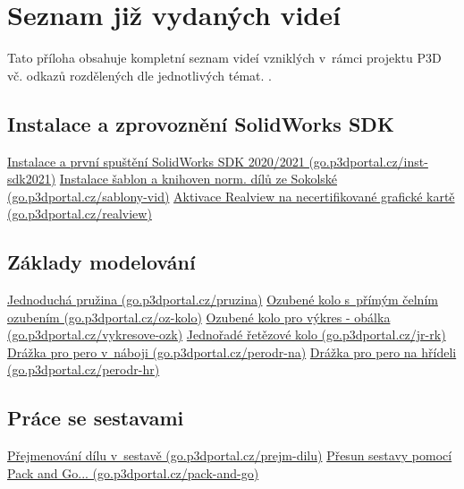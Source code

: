\chapter{Seznam již vydaných videí} \label{released-videos}
Tato příloha obsahuje kompletní seznam videí vzniklých v~rámci projektu P3D vč. odkazů rozdělených dle jednotlivých témat. \newline
\noindent{}.

\section{Instalace a zprovoznění SolidWorks SDK} \label{videa-instalace}
\href{https://go.p3dportal.cz/inst-sdk2021}{Instalace a první spuštění SolidWorks SDK 2020/2021 (go.p3dportal.cz/inst-sdk2021)} \newline
\href{https://go.p3dportal.cz/sablony-vid}{Instalace šablon a knihoven norm. dílů ze Sokolské (go.p3dportal.cz/sablony-vid)} \newline
\href{https://go.p3dportal.cz/GkkCtx}{Aktivace Realview na necertifikované grafické kartě (go.p3dportal.cz/realview)} \newline

\section{Základy modelování} \label{videa-modelovani}
\href{https://go.p3dportal.cz/pruzina}{Jednoduchá pružina (go.p3dportal.cz/pruzina)} \newline
\href{https://go.p3dportal.cz/oz-kolo}{Ozubené kolo s~přímým čelním ozubením (go.p3dportal.cz/oz-kolo)} \newline
\href{https://go.p3dportal.cz/vykresove-ozk}{Ozubené kolo pro výkres - obálka (go.p3dportal.cz/vykresove-ozk)} \newline
\href{https://go.p3dportal.cz/jr-rk}{Jednořadé řetězové kolo (go.p3dportal.cz/jr-rk)} \newline
\href{https://go.p3dportal.cz/perodr-na}{Drážka pro pero v~náboji (go.p3dportal.cz/perodr-na)} \newline
\href{https://go.p3dportal.cz/perodr-hr}{Drážka pro pero na hřídeli (go.p3dportal.cz/perodr-hr)} \newline

\section{Práce se sestavami} \label{videa-sestavy}
\href{https://go.p3dportal.cz/prejm-dilu}{Přejmenování dílu v~sestavě (go.p3dportal.cz/prejm-dilu)} \newline
\href{https://go.p3dportal.cz/pack-and-go}{Přesun sestavy pomocí Pack and Go... (go.p3dportal.cz/pack-and-go)} \newline

